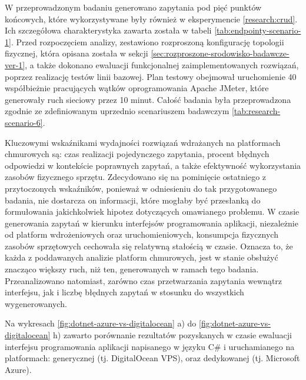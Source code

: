 W przeprowadzonym badaniu generowano zapytania pod pięć punktów końcowych, które wykorzystywane były również w eksperymencie \ref{research:crud}. Ich szczegółowa charakterystyka zawarta została w tabeli \ref{tab:endpointy-scenario-1}. Przed rozpoczęciem analizy, zestawiono rozproszoną konfigurację topologii fizycznej, która opisana została w sekcji \ref{sec:rozproszone-srodowisko-badawcze-ver-1}, a także dokonano ewaluacji funkcjonalnej zaimplementowanych rozwiązań, poprzez realizację testów linii bazowej. Plan testowy obejmował uruchomienie 40 współbieżnie pracujących wątków oprogramowania Apache JMeter, które generowały ruch sieciowy przez 10 minut. Całość badania była przeprowadzona zgodnie ze zdefiniowanym uprzednio scenariuszem badawczym \ref{tab:research-scenario-6}.

Kluczowymi wskaźnikami wydajności rozwiązań wdrażanych na platformach chmurowych są: czas realizacji pojedynczego zapytania, procent błędnych odpowiedzi w kontekście poprawnych zapytań, a także efektywność wykorzystania zasobów fizycznego sprzętu. Zdecydowano się na pominięcie ostatniego z przytoczonych wskaźników, ponieważ w odniesieniu do tak przygotowanego badania, nie dostarcza on informacji, które mogłaby być przesłanką do formułowania jakichkolwiek hipotez dotyczących omawianego problemu. W czasie generowania zapytań w kierunku interfejsów programowania aplikacji, niezależnie od platform wdrożeniowych oraz uruchomieniowych, konsumpcja fizycznych zasobów sprzętowych cechowała się relatywną stałością w czasie. Oznacza to, że każda z poddawanych analizie platform chmurowych, jest w stanie obsłużyć znacząco większy ruch, niż ten, generowanych w ramach tego badania. Przeanalizowano natomiast, zarówno czas przetwarzania zapytania wewnątrz interfejsu, jak i liczbę błędnych zapytań w stosunku do wszystkich wygenerowanych.     

Na wykresach \ref{fig:dotnet-azure-vs-digitalocean} a) do \ref{fig:dotnet-azure-vs-digitalocean} h) zawarto porównanie rezultatów pozyskanych w czasie ewaluacji interfejsu programowania aplikacji napisanego w języku C\# i uruchamianego na platformach: generycznej (tj. DigitalOcean VPS), oraz dedykowanej (tj. Microsoft Azure).

